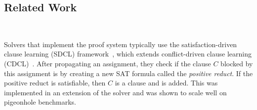 



\subsection{Related Work}~\label{subsec:relatedwork}






Solvers that implement the \pr proof system typically use the
satisfaction-driven clause learning (SDCL) framework~\cite{sdcl}, which extends
conflict-driven clause learning (CDCL)~\cite{sat-handbook}. 
After propagating an assignment, they check if the clause $C$ blocked by this
assignment is \pr by creating a new SAT formula called the \emph{positive
reduct}. If the positive reduct is satisfiable, then $C$ is a \pr clause and is
added. This was implemented in an extension of the solver \lingeling and was
shown to scale well on pigeonhole benchmarks.

